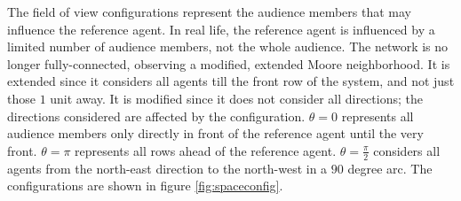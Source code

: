 \hspace{\parindent}The field of view configurations represent the audience members that may influence the reference agent.
In real life, the  reference agent is influenced by a limited number of audience members, not the whole audience.
The network is no longer fully-connected, observing a modified, extended Moore neighborhood.
It is extended since it considers all agents till the front row of the system, and not just those $1$ unit away.
It is modified since it does not consider all directions; the directions considered are affected by the configuration.
$\theta = 0$ represents all audience members only directly in front of the reference agent until the very front. 
$\theta = \pi$ represents all rows ahead of the reference agent. 
$\theta = \frac{\pi}{2}$ considers all agents from the north-east direction to the north-west in a $90$ degree arc. The configurations are shown in figure \ref{fig:spaceconfig}.

